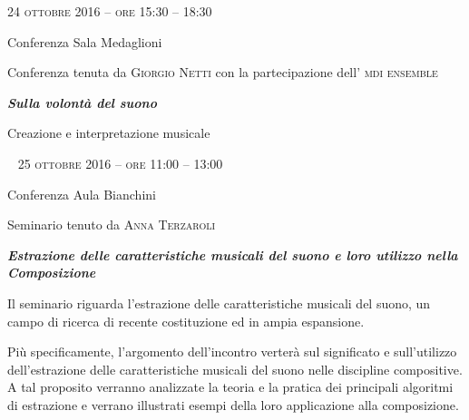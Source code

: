
\begin{flushright}

\large{
	\scshape{
	24 ottobre 2016 -- ore 15:30 -- 18:30
	}}

\medskip
	
\small{Conferenza
	\newline Sala Medaglioni}

\medskip

{\fontsize{42}{42} }

\normalfont

\normalsize

\bigskip

Conferenza tenuta da \textsc{Giorgio Netti} con la partecipazione dell' \textsc{mdi ensemble}

\bigskip

\textbf{\emph{Sulla volontà del suono}}

Creazione e interpretazione musicale


\end{flushright}

\clearpage

\begin{flushleft}

~\vfill
\large{
	\scshape{
	25 ottobre 2016 -- ore 11:00 -- 13:00
	}}

\medskip
	
\small{Conferenza
	\newline Aula Bianchini}

\medskip

{\fontsize{42}{42} }

\normalfont

\normalsize

\bigskip

Seminario tenuto da \textsc{Anna Terzaroli}

\bigskip

\textbf{\emph{Estrazione delle caratteristiche musicali del suono e loro utilizzo nella Composizione}}

Il seminario riguarda l'estrazione delle caratteristiche musicali del suono, un campo di ricerca di recente costituzione ed in ampia espansione. 

Più specificamente, l'argomento dell'incontro verterà sul significato e sull'utilizzo dell'estrazione delle caratteristiche musicali del suono nelle discipline compositive. A tal proposito verranno analizzate la teoria e la pratica dei principali algoritmi di estrazione e verrano illustrati esempi della loro applicazione alla composizione.

\end{flushleft}